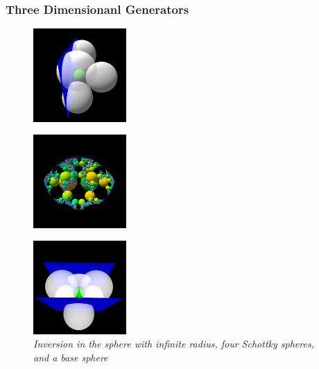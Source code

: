 \subsubsection{Three Dimensionanl Generators}

\begin{figure}[h!tbp]
 \begin{minipage}[t]{0.5\hsize}
  \begin{minipage}{0.25\hsize}
   \center
   \includegraphics[width=1.4in, height=1.4in, keepaspectratio]{./img/application/3dGen/infSphereGen.pdf}
   \label{fig:infSphereGen}
  \end{minipage}
  \hspace*{\fill}
  \begin{minipage}{0.25\hsize}
   \center
   \includegraphics[width=1.4in, height=1.4in, keepaspectratio]{./img/application/3dGen/infSphereOrbit.pdf}
   \label{fig:infSphereOrb}
  \end{minipage}
  \hspace*{\fill}
  \caption{\textit{Inversion in the sphere with infinite radius, four
  Schottky spheres, and a base sphere}}
  \label{fig:infSphere}
 \end{minipage}
 \hspace*{\fill}
 \begin{minipage}[t]{0.5\hsize}
  \begin{minipage}{0.25\hsize}
   \center
   \includegraphics[width=1.4in, height=1.4in, keepaspectratio]{./img/application/3dGen/translationGen.pdf}

\end{minipage}
\end{minipage}
\end{figure}

